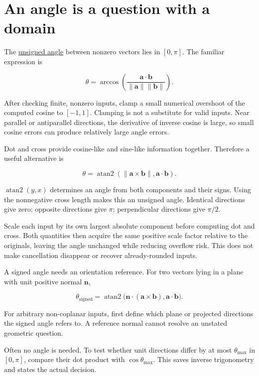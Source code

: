 \section{An angle is a question with a domain}\label{01-foundations-i-ch017-an-angle-is-a-question-with-a-domain}

The \hyperref[01-foundations-i-ch017-an-angle-is-a-question-with-a-domain]{unsigned angle} between nonzero vectors lies in \([0,\pi]\). The familiar expression is

\[
\theta=\arccos\left(
\frac{\mathbf a\cdot\mathbf b}{\|\mathbf a\|\|\mathbf b\|}
\right).
\]

After checking finite, nonzero inputs, clamp a small numerical overshoot of the computed cosine to \([-1,1]\). Clamping is not a substitute for valid inputs. Near parallel or antiparallel directions, the derivative of inverse cosine is large, so small cosine errors can produce relatively large angle errors.

Dot and cross provide cosine-like and sine-like information together. Therefore a useful alternative is

\[
\theta=\operatorname{atan2}
\left(\|\mathbf a\times\mathbf b\|,\mathbf a\cdot\mathbf b\right).
\]

\(\operatorname{atan2}(y,x)\) determines an angle from both components and their signs. Using the nonnegative cross length makes this an unsigned angle. Identical directions give zero; opposite directions give \(\pi\); perpendicular directions give \(\pi/2\).

Scale each input by its own largest absolute component before computing dot and cross. Both quantities then acquire the same positive scale factor relative to the originals, leaving the angle unchanged while reducing overflow risk. This does not make cancellation disappear or recover already-rounded inputs.

A signed angle needs an orientation reference. For two vectors lying in a plane with unit positive normal \(\mathbf n\),

\[
\theta_{\mathrm{signed}}=
\operatorname{atan2}\big(\mathbf n\cdot(\mathbf a\times\mathbf b),
\mathbf a\cdot\mathbf b\big).
\]

For arbitrary non-coplanar inputs, first define which plane or projected directions the signed angle refers to. A reference normal cannot resolve an unstated geometric question.

Often no angle is needed. To test whether unit directions differ by at most \(\theta_{\max}\) in \([0,\pi]\), compare their dot product with \(\cos\theta_{\max}\). This saves inverse trigonometry and states the actual decision.

